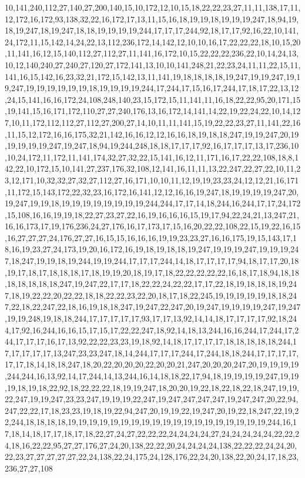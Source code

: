 10,141,240,112,27,140,27,200,140,15,10,172,12,10,15,18,22,22,23,27,11,11,138,17,11,12,172,16,172,93,138,32,22,16,172,17,13,11,15,16,18,19,19,18,19,19,19,247,18,94,19,18,19,247,18,19,247,18,18,19,19,19,19,244,17,17,17,244,92,18,17,17,92,16,22,10,141,24,172,11,15,142,14,24,22,13,112,236,172,14,142,12,10,10,16,17,22,22,22,18,10,15,20,11,141,16,12,15,140,112,27,112,27,11,141,16,172,10,15,22,22,22,236,22,10,14,24,13,10,12,140,240,27,240,27,120,27,172,141,13,10,10,141,248,21,22,23,24,11,11,22,15,11,141,16,15,142,16,23,32,21,172,15,142,13,11,141,19,18,18,18,18,19,247,19,19,247,19,19,247,19,19,19,19,19,19,18,19,19,19,19,244,17,244,17,15,16,17,244,17,18,17,22,13,12,24,15,141,16,16,172,24,108,248,140,23,15,172,15,11,141,11,16,18,22,22,95,20,171,15,19,141,15,16,171,172,110,27,27,240,176,13,16,172,14,141,14,22,19,22,24,22,10,14,127,10,11,172,112,112,27,112,27,200,27,14,10,11,11,141,15,19,22,22,23,27,11,141,22,16,11,15,12,172,16,16,175,32,21,142,16,16,12,12,16,16,18,19,18,18,247,19,19,247,20,19,19,19,19,19,247,19,247,18,94,19,244,248,18,18,17,17,17,92,16,17,17,17,13,17,236,10,10,24,172,11,172,11,141,174,32,27,32,22,15,141,16,12,11,171,16,17,22,22,108,18,8,142,22,10,172,15,10,141,27,237,176,32,108,12,141,16,11,11,13,22,247,22,27,22,10,11,23,12,171,10,32,32,27,32,27,112,27,16,171,10,10,11,12,19,19,23,23,24,12,12,21,16,171,11,172,15,143,172,22,32,23,16,172,16,141,12,12,16,16,19,247,18,19,19,19,19,247,20,19,247,19,19,18,19,19,19,19,19,19,19,19,244,244,17,17,14,18,244,16,244,17,17,24,172,15,108,16,16,19,19,18,22,27,23,27,22,16,19,16,16,16,15,19,17,94,22,24,21,13,247,21,16,16,173,17,19,176,236,24,27,176,16,17,173,17,15,16,20,22,22,108,22,15,19,22,16,15,16,27,27,27,24,176,27,27,16,15,15,16,16,16,19,19,23,23,27,16,16,175,19,15,143,17,18,16,19,23,27,24,173,19,20,16,172,16,19,18,19,18,18,19,247,19,19,19,247,19,19,19,247,18,247,19,19,18,19,244,19,19,244,17,17,17,244,14,18,17,17,17,17,94,18,17,17,20,18,19,17,18,17,18,18,18,17,18,19,19,20,18,19,17,18,22,22,22,22,22,16,18,17,18,94,18,18,18,18,18,18,18,247,19,247,22,17,17,18,22,22,24,22,22,17,17,22,18,19,18,18,18,19,247,18,19,22,22,20,22,22,18,18,22,22,23,22,20,18,17,18,22,245,19,19,19,19,19,18,18,247,22,18,22,247,22,18,16,19,18,18,247,19,247,22,247,20,19,247,19,19,19,19,247,19,247,19,19,248,19,18,18,244,17,17,17,17,17,93,17,17,13,92,14,14,18,17,17,17,17,92,18,244,17,92,16,244,16,16,15,17,15,17,22,22,247,18,92,14,18,13,244,16,16,244,17,244,17,244,17,17,17,16,17,13,92,22,22,23,23,19,18,92,14,18,17,17,17,17,18,18,18,18,18,244,17,17,17,17,17,13,247,23,23,247,18,14,244,17,17,17,244,17,244,18,18,244,17,17,17,17,17,17,18,14,18,18,247,18,20,22,20,20,20,22,20,20,21,247,20,20,20,247,20,19,19,19,19,244,244,16,13,92,14,17,244,14,13,244,16,14,18,18,22,17,94,18,19,19,19,19,247,19,19,19,18,19,18,22,92,18,22,22,22,18,19,19,247,18,20,20,19,22,18,22,18,22,18,247,19,19,22,247,19,19,247,23,23,247,19,19,19,22,247,19,247,247,247,247,19,247,247,20,22,94,247,22,22,17,18,23,23,19,18,19,22,94,247,20,19,19,22,19,247,20,19,22,18,247,22,19,22,244,18,18,18,18,19,19,19,19,19,19,19,19,19,19,19,19,19,19,19,19,19,19,19,244,16,17,18,14,18,17,17,18,17,18,22,27,24,27,22,22,22,24,24,24,24,27,24,24,24,24,24,22,22,24,18,16,22,22,95,27,27,176,27,24,20,138,22,22,20,24,24,24,24,138,22,22,22,24,24,20,22,23,27,27,27,27,27,22,24,138,22,24,175,24,128,176,22,24,20,138,22,20,24,17,18,23,236,27,27,108